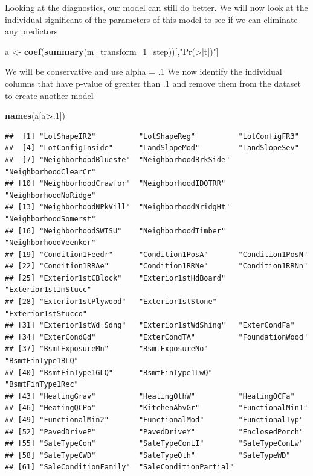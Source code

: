 \documentclass[
]{article}
\newenvironment{Shaded}{\begin{snugshade}}{\end{snugshade}}
\newcommand{\DecValTok}[1]{\textcolor[rgb]{0.00,0.00,0.81}{#1}}
\newcommand{\KeywordTok}[1]{\textcolor[rgb]{0.13,0.29,0.53}{\textbf{#1}}}
\newcommand{\NormalTok}[1]{#1}
\newcommand{\OperatorTok}[1]{\textcolor[rgb]{0.81,0.36,0.00}{\textbf{#1}}}
\newcommand{\StringTok}[1]{\textcolor[rgb]{0.31,0.60,0.02}{#1}}
\begin{document}
Looking at the diagnostics, our model can still do better. We will now look at the individual significant of the parameters of this model to see if we can eliminate any predictors

\begin{Shaded}
\begin{Highlighting}[]
\NormalTok{a <-}\StringTok{ }\KeywordTok{coef}\NormalTok{(}\KeywordTok{summary}\NormalTok{(m_transform_}\DecValTok{1}\NormalTok{_step))[,}\StringTok{"Pr(>|t|)"}\NormalTok{] }
\end{Highlighting}
\end{Shaded}

We will be conservative and use alpha = .1 We now identify the individual columns that have p-value of greater than .1 and remove them from the dataset to create another model

\begin{Shaded}
\begin{Highlighting}[]
\KeywordTok{names}\NormalTok{(a[a}\OperatorTok{>}\NormalTok{.}\DecValTok{1}\NormalTok{])}
\end{Highlighting}
\end{Shaded}

\begin{verbatim}
##  [1] "LotShapeIR2"          "LotShapeReg"          "LotConfigFR3"        
##  [4] "LotConfigInside"      "LandSlopeMod"         "LandSlopeSev"        
##  [7] "NeighborhoodBlueste"  "NeighborhoodBrkSide"  "NeighborhoodClearCr" 
## [10] "NeighborhoodCrawfor"  "NeighborhoodIDOTRR"   "NeighborhoodNoRidge" 
## [13] "NeighborhoodNPkVill"  "NeighborhoodNridgHt"  "NeighborhoodSomerst" 
## [16] "NeighborhoodSWISU"    "NeighborhoodTimber"   "NeighborhoodVeenker" 
## [19] "Condition1Feedr"      "Condition1PosA"       "Condition1PosN"      
## [22] "Condition1RRAe"       "Condition1RRNe"       "Condition1RRNn"      
## [25] "Exterior1stCBlock"    "Exterior1stHdBoard"   "Exterior1stImStucc"  
## [28] "Exterior1stPlywood"   "Exterior1stStone"     "Exterior1stStucco"   
## [31] "Exterior1stWd Sdng"   "Exterior1stWdShing"   "ExterCondFa"         
## [34] "ExterCondGd"          "ExterCondTA"          "FoundationWood"      
## [37] "BsmtExposureMn"       "BsmtExposureNo"       "BsmtFinType1BLQ"     
## [40] "BsmtFinType1GLQ"      "BsmtFinType1LwQ"      "BsmtFinType1Rec"     
## [43] "HeatingGrav"          "HeatingOthW"          "HeatingQCFa"         
## [46] "HeatingQCPo"          "KitchenAbvGr"         "FunctionalMin1"      
## [49] "FunctionalMin2"       "FunctionalMod"        "FunctionalTyp"       
## [52] "PavedDriveP"          "PavedDriveY"          "EnclosedPorch"       
## [55] "SaleTypeCon"          "SaleTypeConLI"        "SaleTypeConLw"       
## [58] "SaleTypeCWD"          "SaleTypeOth"          "SaleTypeWD"          
## [61] "SaleConditionFamily"  "SaleConditionPartial"
\end{verbatim}
\end{document}
